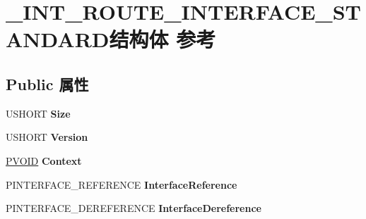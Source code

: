 \hypertarget{struct___i_n_t___r_o_u_t_e___i_n_t_e_r_f_a_c_e___s_t_a_n_d_a_r_d}{}\section{\+\_\+\+I\+N\+T\+\_\+\+R\+O\+U\+T\+E\+\_\+\+I\+N\+T\+E\+R\+F\+A\+C\+E\+\_\+\+S\+T\+A\+N\+D\+A\+R\+D结构体 参考}
\label{struct___i_n_t___r_o_u_t_e___i_n_t_e_r_f_a_c_e___s_t_a_n_d_a_r_d}
\subsection*{Public 属性}
\begin{DoxyCompactItemize}
\item 
\mbox{\label{struct___i_n_t___r_o_u_t_e___i_n_t_e_r_f_a_c_e___s_t_a_n_d_a_r_d_a6b28fe7117dc2fc2b892700c742d72a0}} 
U\+S\+H\+O\+RT {\bfseries Size}
\item 
\mbox{\label{struct___i_n_t___r_o_u_t_e___i_n_t_e_r_f_a_c_e___s_t_a_n_d_a_r_d_a2a69a33692e475424c14d96b59f1d87f}} 
U\+S\+H\+O\+RT {\bfseries Version}
\item 
\mbox{\label{struct___i_n_t___r_o_u_t_e___i_n_t_e_r_f_a_c_e___s_t_a_n_d_a_r_d_a2fe181f6cc5fa24b14ee290d2fdf6ff7}} 
\hyperlink{interfacevoid}{P\+V\+O\+ID} {\bfseries Context}
\item 
\mbox{\label{struct___i_n_t___r_o_u_t_e___i_n_t_e_r_f_a_c_e___s_t_a_n_d_a_r_d_ade843acc14eaee7556dc11b0b7d6dd9c}} 
P\+I\+N\+T\+E\+R\+F\+A\+C\+E\+\_\+\+R\+E\+F\+E\+R\+E\+N\+CE {\bfseries Interface\+Reference}
\item 
\mbox{\label{struct___i_n_t___r_o_u_t_e___i_n_t_e_r_f_a_c_e___s_t_a_n_d_a_r_d_a62ca871f282d99fb4402e1d4902d8cfb}} 
P\+I\+N\+T\+E\+R\+F\+A\+C\+E\+\_\+\+D\+E\+R\+E\+F\+E\+R\+E\+N\+CE {\bfseries Interface\+Dereference}
\item 

\end{DoxyCompactItemize}
